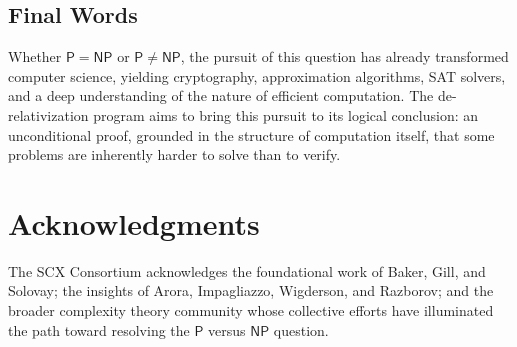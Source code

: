 \documentclass[11pt,a4paper]{article}
\theoremstyle{plain}
\theoremstyle{definition}
\theoremstyle{remark}
\newcommand{\PP}{\mathsf{P}}
\newcommand{\NP}{\mathsf{NP}}
\begin{document}
\subsection{Final Words}

Whether $\PP = \NP$ or $\PP \neq \NP$, the pursuit of this question has
already transformed computer science, yielding cryptography, approximation
algorithms, SAT solvers, and a deep understanding of the nature of efficient
computation.  The de-relativization program aims to bring this pursuit to its
logical conclusion: an unconditional proof, grounded in the structure of
computation itself, that some problems are inherently harder to solve than to
verify.

\section*{Acknowledgments}
The SCX Consortium acknowledges the foundational work of Baker, Gill, and
Solovay; the insights of Arora, Impagliazzo, Wigderson, and Razborov; and the
broader complexity theory community whose collective efforts have illuminated
the path toward resolving the $\PP$ versus $\NP$ question.
\end{document}
